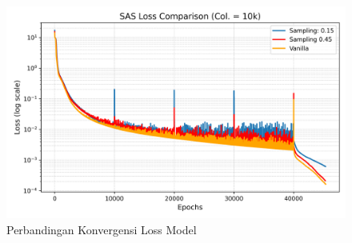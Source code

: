 \begin{figure}[htbp]
    \centering
    \includegraphics[width=0.8 \linewidth]{Gambar/SASLoss-Comparison (1).png}
    \caption{Perbandingan Konvergensi Loss Model}
    \label{fig:loss-SAS-PINNs}
\end{figure}

\cleardoublepage